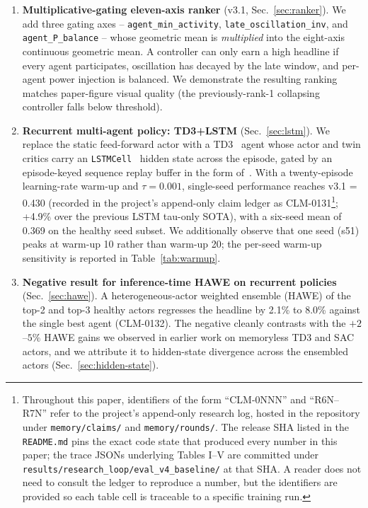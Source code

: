 \documentclass[journal,onecolumn,11pt]{IEEEtran}
\begin{document}
\begin{enumerate}
  \item \textbf{Multiplicative-gating eleven-axis ranker} (v3.1,
        Sec.~\ref{sec:ranker}). We add three gating axes --
        \texttt{agent\_min\_activity}, \texttt{late\_oscillation\_inv},
        and \texttt{agent\_P\_balance} -- whose geometric mean is
        \emph{multiplied} into the eight-axis continuous geometric
        mean. A controller can only earn a high headline if every
        agent participates, oscillation has decayed by the late
        window, and per-agent power injection is balanced. We
        demonstrate the resulting ranking matches paper-figure
        visual quality (the previously-rank-1 collapsing controller
        falls below threshold).
  \item \textbf{Recurrent multi-agent policy: TD3+LSTM}
        (Sec.~\ref{sec:lstm}). We replace the static feed-forward
        actor with a TD3~\cite{fujimoto2018td3} agent whose
        actor and twin critics carry an
        \texttt{LSTMCell}~\cite{hausknecht2015drqn} hidden state
        across the episode, gated by an episode-keyed sequence
        replay buffer in the form of~\cite{ni2022recurrent}. With a twenty-episode learning-rate
        warm-up and $\tau = 0.001$, single-seed performance reaches
        v3.1 = 0.430 (recorded in the project's append-only
        claim ledger as CLM-0131\footnote{Throughout this paper,
        identifiers of the form ``CLM-0NNN'' and ``R6N--R7N''
        refer to the project's append-only research log, hosted
        in the repository under \texttt{memory/claims/} and
        \texttt{memory/rounds/}. The release SHA listed in the
        \texttt{README.md} pins the exact code state that produced
        every number in this paper; the trace JSONs underlying
        Tables I--V are committed under
        \texttt{results/research\_loop/eval\_v4\_baseline/} at
        that SHA. A reader does not need to consult the ledger to
        reproduce a number, but the identifiers are provided so
        each table cell is traceable to a specific training run.};
        +4.9\% over the previous LSTM tau-only
        SOTA), with a six-seed mean of 0.369 on the healthy seed
        subset. We additionally observe that one seed (s51) peaks at
        warm-up 10 rather than warm-up 20; the per-seed warm-up
        sensitivity is reported in Table~\ref{tab:warmup}.
  \item \textbf{Negative result for inference-time HAWE on recurrent
        policies} (Sec.~\ref{sec:hawe}). A heterogeneous-actor
        weighted ensemble (HAWE) of the top-2 and top-3 healthy
        actors regresses the headline by 2.1\% to 8.0\% against the
        single best agent (CLM-0132). The negative cleanly contrasts
        with the $+2$--$5\%$ HAWE gains we observed in earlier work
        on memoryless TD3 and SAC actors, and we attribute it to
        hidden-state divergence across the ensembled actors
        (Sec.~\ref{sec:hidden-state}).
\end{enumerate}
\end{document}
